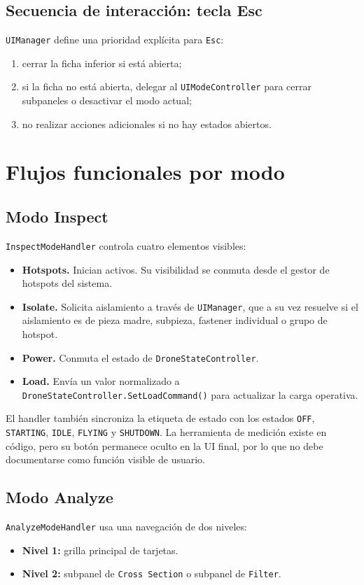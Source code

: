 \documentclass[12pt,letterpaper]{article}
\begin{document}
\subsection{Secuencia de interacción: tecla Esc}
\texttt{UIManager} define una prioridad explícita para \texttt{Esc}:
\begin{enumerate}
    \item cerrar la ficha inferior si está abierta;
    \item si la ficha no está abierta, delegar al \texttt{UIModeController} para cerrar subpaneles o desactivar el modo actual;
    \item no realizar acciones adicionales si no hay estados abiertos.
\end{enumerate}

\section{Flujos funcionales por modo}

\subsection{Modo Inspect}
\texttt{InspectModeHandler} controla cuatro elementos visibles:
\begin{itemize}
    \item \textbf{Hotspots.} Inician activos. Su visibilidad se conmuta desde el gestor de hotspots del sistema.
    \item \textbf{Isolate.} Solicita aislamiento a través de \texttt{UIManager}, que a su vez resuelve si el aislamiento es de pieza madre, subpieza, fastener individual o grupo de hotspot.
    \item \textbf{Power.} Conmuta el estado de \texttt{DroneStateController}.
    \item \textbf{Load.} Envía un valor normalizado a \texttt{DroneStateController.SetLoadCommand()} para actualizar la carga operativa.
\end{itemize}

\noindent El handler también sincroniza la etiqueta de estado con los estados \texttt{OFF}, \texttt{STARTING}, \texttt{IDLE}, \texttt{FLYING} y \texttt{SHUTDOWN}. La herramienta de medición existe en código, pero su botón permanece oculto en la UI final, por lo que no debe documentarse como función visible de usuario.

\subsection{Modo Analyze}
\texttt{AnalyzeModeHandler} usa una navegación de dos niveles:
\begin{itemize}
    \item \textbf{Nivel 1:} grilla principal de tarjetas.
    \item \textbf{Nivel 2:} subpanel de \texttt{Cross Section} o subpanel de \texttt{Filter}.
\end{itemize}
\end{document}
